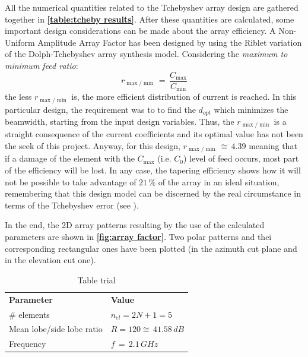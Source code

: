 \documentclass[12pt,a4paper]{article}
\begin{document}
{\begin{multicols}{2}
\indent 

All the numerical quantities related to the Tchebyshev array design are gathered together in \textbf{\cref{table:tcheby results}}. After these quantities are calculated, some important design considerations can be made about the array efficiency. A Non-Uniform Amplitude Array Factor has been designed by using the Riblet variation of the Dolph-Tchebyshev array synthesis model. Considering the \emph{maximum to minimum feed ratio}: \[r_{\max/\min}\,=\,\frac{C_{\max}}{C_{\min}}\] 
the less $r_{\max/\min}$ is, the more efficient distribution of current is reached. In this particular design, the requirement was to to find the $d_{opt}$ which minimizes the beamwidth, starting from the input design variables. Thus, the $r_{\max/\min}$ is a straight consequence of the current coefficients and its optimal value has not been the seek of this project. Anyway, for this design, $r_{\max/\min}\,\cong\,4.39$ meaning that if a damage of the element with the $C_{\max}$ (i.e. $C_0$) level of feed occurs, most part of the efficiency will be lost. In any case, the tapering efficiency shows how it will not be possible to take advantage of $21\,\%$ of the array in an ideal situation, remembering that this design model can be discerned by the real circumstance in terms of the Tchebyshev error (see \textbf{\cite{Balanis1}}). 

\indent

In the end, the 2D array patterns resulting by the use of the calculated parameters are shown in \textbf{\cref{fig:array factor}}. Two polar patterns and thei corresponding rectangular ones have been plotted (in the azimuth cut plane and in the elevation cut one). 

\end{multicols}

			\begin{table}[b!]
			\begin{center}
						{\selectfont
			\begin{tabular}{||m{5cm}|m{5cm}||}
				\hline 
				\rowcolor{lightgray}\multicolumn{2}{|c|}{\textbf{Array factor input design variabiles}} 
				\\
				\hline
				\cellcolor{mintbg}\textbf{Parameter} & \cellcolor{mintbg}\textbf{Value}\\
				\hline
				\# elements & $n_{el}=2N+1=5$\\
				\hline
				Mean lobe/side lobe
				ratio  & $R = 120 \cong\, 41.58\,dB$\\
				\hline 
				Frequency & $f\,=\,2.1\,GHz$\\
				\hline
\end{tabular}}
\caption{Table trial}
\label{table:input design cheb}
\end{center}
\end{table}

}
\end{document}

